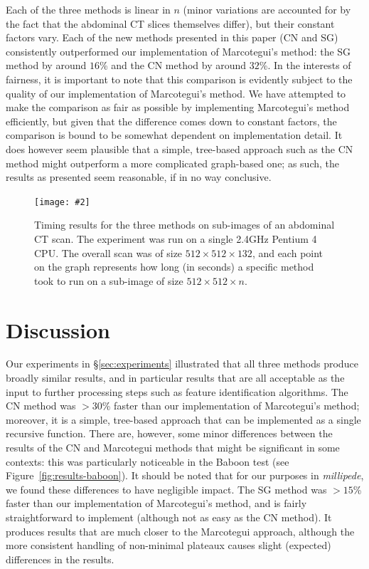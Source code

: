 \documentclass[preprint,a4paper]{elsarticle}
\newcommand{\stufigex}[5]					%
{
	\begin{figure}[#5]
	\begin{center}
		\texttt{[image: \#2]}
		\caption{#3}
		\label{#4}
	\end{center}
	\end{figure}
}
\begin{document}
Each of the three methods is linear in $n$ (minor variations are accounted for by the fact that the abdominal CT slices themselves differ), but their constant factors vary. Each of the new methods presented in this paper (CN and SG) consistently outperformed our implementation of Marcotegui's method: the SG method by around $16$\% and the CN method by around $32$\%. In the interests of fairness, it is important to note that this comparison is evidently subject to the quality of our implementation of Marcotegui's method. We have attempted to make the comparison as fair as possible by implementing Marcotegui's method efficiently, but given that the difference comes down to constant factors, the comparison is bound to be somewhat dependent on implementation detail. It does however seem plausible that a simple, tree-based approach such as the CN method might outperform a more complicated graph-based one; as such, the results as presented seem reasonable, if in no way conclusive.

\stufigex{width=.95\linewidth}{timings.png}{Timing results for the three methods on sub-images of an abdominal CT scan. The experiment was run on a single 2.4GHz Pentium 4 CPU. The overall scan was of size $512 \times 512 \times 132$, and each point on the graph represents how long (in seconds) a specific method took to run on a sub-image of size $512 \times 512 \times n$.}{fig:timings}{!t}


\section{Discussion}
\label{sec:discussion}

Our experiments in \S\ref{sec:experiments} illustrated that all three methods produce broadly similar results, and in particular results that are all acceptable as the input to further processing steps such as feature identification algorithms. The CN method was $> 30$\% faster than our implementation of Marcotegui's method; moreover, it is a simple, tree-based approach that can be implemented as a single recursive function. There are, however, some minor differences between the results of the CN and Marcotegui methods that might be significant in some contexts: this was particularly noticeable in the Baboon test (see Figure~\ref{fig:results-baboon}). It should be noted that for our purposes in \emph{millipede}, we found these differences to have negligible impact. The SG method was $> 15$\% faster than our implementation of Marcotegui's method, and is fairly straightforward to implement (although not as easy as the CN method). It produces results that are much closer to the Marcotegui approach, although the more consistent handling of non-minimal plateaux causes slight (expected) differences in the results.
\end{document}

